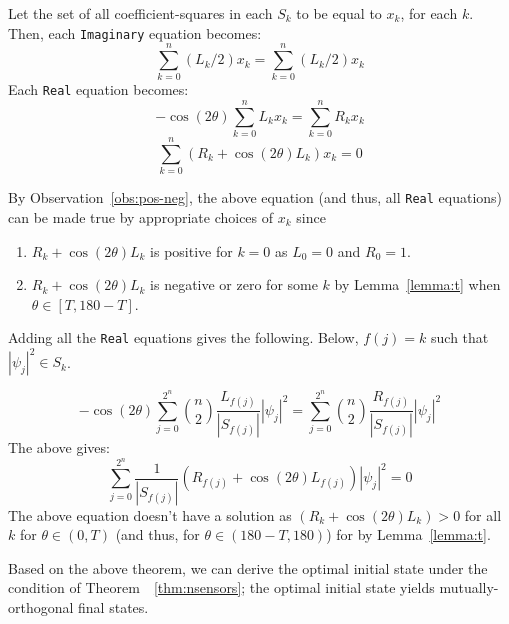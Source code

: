 \begin{prf} 
 Let the set of all coefficient-squares in each $S_k$ to be equal to 
$x_k$, for each $k$. Then, each {\tt Imaginary} equation becomes:
\begin{equation}
\sum_{k=0}^{n}  (L_k/2)x_k  = \sum_{k=0}^{n} (L_k/2)x_k \label{eqn:imag-final}
\end{equation}
Each {\tt Real} equation becomes:
\begin{equation}
    -\cos(2\theta) \sum_{k=0}^{n}    L_kx_k  = \sum_{k=0}^{n} R_k x_k 
    \label{eqn:real}
\end{equation}
\begin{equation}
  \sum_{k=0}^{n} ( R_k + \cos(2\theta) L_k) x_k = 0 \label{eqn:real-final}  
\end{equation}


By Observation~\ref{obs:pos-neg}, the above equation (and thus, all {\tt Real} equations) can be made true by appropriate choices of $x_k$ since 
\begin{enumerate}
    \item $R_k + \cos(2\theta)L_k$ is positive for $k=0$ as $L_0 = 0$ and $R_0 = 1$.
    \item $R_k + \cos(2\theta)L_k$ is negative or zero for some $k$ by Lemma~\ref{lemma:t} when $\theta \in [T, 180-T]$.
\end{enumerate}

Adding all the {\tt Real} equations gives the following. Below, $f(j) = k$ such that $|\psi_j|^2 \in S_k$.

$$ -\cos(2\theta)\sum_{j=0}^{2^n} {n \choose 2} \frac{L_{f(j)}}{|S_{f(j)}|} |\psi_j|^2	= \sum_{j=0}^{2^n} {n \choose 2} \frac{R_{f(j)}}{|S_{f(j)}|}  |\psi_j|^2 $$
The above gives: 
$$\sum_{j=0}^{2^n} \frac{1}{|S_{f(j)}|} (R_{f(j)} + \cos(2\theta)L_{f(j)})  |\psi_j|^2 = 0$$
The above equation doesn't have a solution as $(R_k + \cos(2\theta)L_k) > 0$ for all $k$
for $\theta \in (0, T)$ (and thus, for $\theta \in (180-T, 180)$) for by Lemma~\ref{lemma:t}.
\end{prf}

Based on the above theorem, we can derive the optimal initial state under the condition of Theorem~~\ref{thm:nsensors}; the optimal initial state yields mutually-orthogonal final states.

